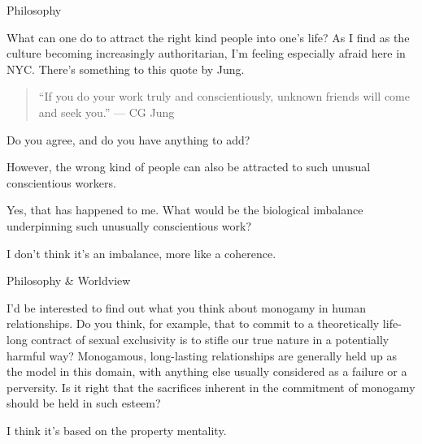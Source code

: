 \documentclass[11pt,oneside,openany,extrafontsizes]{memoir}
\begin{document}
\begin{emailexchange}{Philosophy}

    \begin{question}
        What can one do to attract the right kind people into one's life? As I find as the culture becoming increasingly authoritarian, I'm feeling especially afraid here in NYC. There's something to this quote by Jung.

        \begin{quote}
        \enquote{If you do your work truly and conscientiously, unknown friends will come and seek you.} --- CG Jung
        \end{quote}

        Do you agree, and do you have anything to add?
    \end{question}

    \begin{answer}
        However, the wrong kind of people can also be attracted to such unusual conscientious workers.
    \end{answer}

    \begin{question}
        Yes, that has happened to me. What would be the biological imbalance underpinning such unusually conscientious work?
    \end{question}

    \begin{answer}
        I don't think it's an imbalance, more like a coherence.
    \end{answer}
\end{emailexchange}

\begin{qaexchange}{Philosophy \& Worldview}

    \begin{question}
        I'd be interested to find out what you think about monogamy in human relationships. Do you think, for example, that to commit to a theoretically life-long contract of sexual exclusivity is to stifle our true nature in a potentially harmful way? Monogamous, long-lasting relationships are generally held up as the model in this domain, with anything else usually considered as a failure or a perversity. Is it right that the sacrifices inherent in the commitment of monogamy should be held in such esteem?
    \end{question}

    \begin{answer}
      I think it's based on the property mentality.
    \end{answer}
\end{qaexchange}
\end{document}
